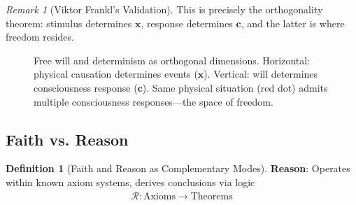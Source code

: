 \documentclass[11pt,a4paper]{article}
\theoremstyle{definition}
\newtheorem{definition}{Definition}[section]
\theoremstyle{remark}
\newtheorem{remark}{Remark}[section]
\newcommand{\cc}{\mathbf{c}}
\begin{document}
\begin{small}
\begin{enumerate}
\begin{remark}[Viktor Frankl's Validation]
This is precisely the orthogonality theorem: stimulus determines \(\mathbf{x}\), response determines \(\cc\), and the latter is where freedom resides.
\end{remark}

\begin{figure}[H]
\centering
{}
\caption{Free will and determinism as orthogonal dimensions. Horizontal: physical causation determines events (\(\mathbf{x}\)). Vertical: will determines consciousness response (\(\cc\)). Same physical situation (red dot) admits multiple consciousness responses—the space of freedom.}
\label{fig:freewill_determinism}
\end{figure}

\subsection{Faith vs. Reason}

\begin{definition}[Faith and Reason as Complementary Modes]
\textbf{Reason}: Operates within known axiom systems, derives conclusions via logic
\begin{align}
\mathcal{R}: \text{Axioms} \to \text{Theorems}
\end{align}


\end{definition}
\end{enumerate}
\end{small}
\end{document}
